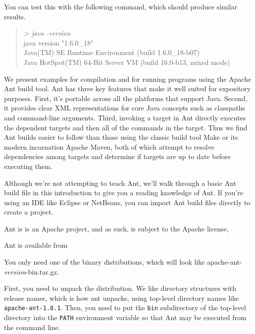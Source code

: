 You can test this with the following command, which
should produce similar results.

\begin{quote}
{\small
\ttfamily
{\it\ttfamily > java -version}
\\
java version "1.6.0\_18"
\\
Java(TM) SE Runtime Environment (build 1.6.0\_18-b07)
\\
Java HotSpot(TM) 64-Bit Server VM (build 16.0-b13, mixed mode)
}
\end{quote}




\noindent We present examples for compilation and for running programs
using the Apache Ant build tool.  Ant has three key features that make
it well suited for expository purposes.  First, it's portable across
all the platforms that support Java.  Second, it provides clear XML
representations for core Java concepts such as classpaths and
command-line arguments.  Third, invoking a target in Ant directly
executes the dependent targets and then all of the commands in the
target.  Thus we find Ant builds easier to follow than those using the
classic build tool Make or its modern incarnation Apache Maven, both
of which attempt to resolve dependencies among targets and determine
if targets are up to date before executing them.

Although we're not attempting to teach Ant, we'll walk through a basic
Ant build file in this introduction to give you a reading knowledge of
Ant.  If you're using an IDE like Eclipse or NetBeans, you can import
Ant build files directly to create a project.

Ant is is an Apache project, and as such, is subject to the Apache license,
\begin{quote}
\end{quote}
%
Ant is available from 
%
\begin{quote}
\end{quote}
%
You only need one of the binary distributions, which will
look like {\ttfamily apache-ant-{\it\ttfamily version}-bin.tar.gz}.

First, you need to unpack the distribution.  We like directory
structures with release names, which is how ant unpacks, using
top-level directory names like {\tt apache-ant-1.8.1}.  Then, you need
to put the {\tt bin} subdirectory of the top-level directory into the
{\tt PATH} environment variable so that Ant may be executed from the
command line.

